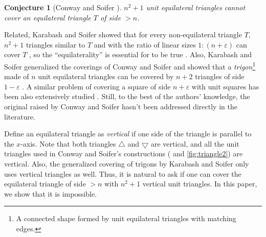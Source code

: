 \documentclass[a4paper]{amsart}
\theoremstyle{plain}
\newtheorem{conjecture}{Conjecture}
\theoremstyle{definition}
\begin{document}
\begin{conjecture}[Conway and Soifer \cite{conway2004coverup}]
\label{conj:main}
$n^2 + 1$ unit equilateral triangles cannot cover an equilateral triangle $T$ of side $> n$.
\end{conjecture}

Related, Karabash and Soifer showed that for every non-equilateral triangle \(T\), \(n^2 + 1\) triangles similar to \(T\) and with the ratio of linear sizes \(1: (n + \varepsilon)\) can cover \(T\) \cite{karabash2005covering},
so the ``equilaterality'' is essential for  to be true \cite{conway2004coverup, soifer2009coffee}.
Also, Karabash and Soifer generalized the coverings of Conway and Soifer and showed that a \emph{trigon}\footnote{A connected shape formed by unit equilateral triangles with matching edges.} made of \(n\) unit equilateral triangles can be covered by \(n + 2\) triangles of side \(1 - \varepsilon\) \cite{karabash2005covering}.
A similar problem of covering a square of side \(n + \varepsilon\) with unit squares has been also extensively studied \cite{karabash2006sharp, karabash2008note, chung2009packing, wang2016new, chungEfficientPackingsUnit2020}.
Still, to the best of the authors' knowledge, the original  raised by Conway and Soifer hasn't been addressed directly in the literature.

Define an equilateral triangle as \emph{vertical} if one side of the triangle is parallel to the $x$-axis.
Note that both triangles $\bigtriangleup$ and $\bigtriangledown$ are vertical, and all the unit triangles used in Conway and Soifer's constructions ( and \ref{fig:triangle2}) are vertical.
Also, the generalized covering of trigons by Karabash and Soifer \cite{karabash2005covering} only uses vertical triangles as well.
Thus, it is natural to ask if one can cover the equilateral triangle of side \(> n\) with \(n^2 + 1\) vertical unit triangles.
In this paper, we show that it is impossible.
\end{document}
